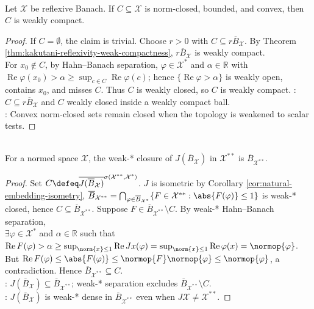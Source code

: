 \begin{corollary} \label{cor:closed-bounded-convex-reflexive-weakly-compact} \\
Let $\mathcal X$ be reflexive Banach. If $C\subseteq\mathcal X$ is norm-closed, bounded, and convex, then $C$ is weakly compact.
\begin{proof}
If $C=\emptyset$, the claim is trivial. Choose $r>0$ with $C\subseteq r\overline{B}_{\mathcal X}$. By Theorem \ref{thm:kakutani-reflexivity-weak-compactness}, $r\overline{B}_{\mathcal X}$ is weakly compact.\\
For $x_0\notin C$, by Hahn--Banach separation, $\varphi\in\mathcal X^*$ and $\alpha\in\mathbb R$ with $\operatorname{Re}\varphi(x_0)>\alpha\geq\sup_{c\in C}\operatorname{Re}\varphi(c)$; hence $\{\operatorname{Re}\varphi>\alpha\}$ is weakly open, contains $x_0$, and misses $C$. Thus $C$ is weakly closed, so $C$ is weakly compact.
: $C\subseteq r\overline{B}_{\mathcal X}$ and $C$ weakly closed inside a weakly compact ball.\\
: Convex norm-closed sets remain closed when the topology is weakened to scalar tests.
\end{proof}
\end{corollary}

\begin{theorem} \label{thm:goldstine-unit-ball} \\
For a normed space $\mathcal{X}$, the weak-* closure of $J(\overline{B}_{\mathcal{X}})$ in $\mathcal{X}^{**}$ is $\overline{B}_{\mathcal{X}^{**}}$.
\begin{proof}
Set $C\defeq\overline{J(\overline{B}_{\mathcal X})}^{\sigma(\mathcal X^{**},\mathcal X^*)}$. $J$ is isometric by Corollary \ref{cor:natural-embedding-isometry}, $\overline{B}_{\mathcal X^{**}}=\bigcap_{\varphi\in\overline{B}_{\mathcal X^*}}\{F\in\mathcal X^{**}:\abs{F(\varphi)}\leq1\}$ is weak-* closed, hence $C\subseteq\overline{B}_{\mathcal X^{**}}$. Suppose $F\in\overline{B}_{\mathcal X^{**}}\setminus C$. By weak-* Hahn--Banach separation,\\
$\exists\varphi\in\mathcal X^*$ and $\alpha\in\mathbb R$ such that $\operatorname{Re}F(\varphi)>\alpha\geq\sup_{\norm{x}\leq1}\operatorname{Re}Jx(\varphi)=\sup_{\norm{x}\leq1}\operatorname{Re}\varphi(x)=\normop{\varphi}$.\\
But $\operatorname{Re}F(\varphi)\leq\abs{F(\varphi)}\leq\normop{F}\normop{\varphi}\leq\normop{\varphi}$, a contradiction. Hence $\overline{B}_{\mathcal X^{**}}\subseteq C$.\\
: $J(\overline{B}_{\mathcal X})\subseteq\overline{B}_{\mathcal X^{**}}$; weak-* separation excludes $\overline{B}_{\mathcal X^{**}}\setminus C$.\\
: $J(\overline{B}_{\mathcal X})$ is weak-* dense in $\overline{B}_{\mathcal X^{**}}$ even when $J\mathcal X\neq\mathcal X^{**}$.
\end{proof}
\end{theorem}

